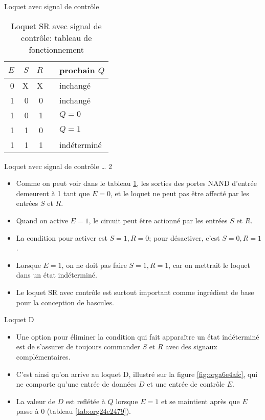\documentclass[presentation]{beamer}
\begin{document}
\begin{frame}[label={sec:org23cd420}]{Loquet avec signal de contrôle}
\begin{table}[htbp]
\caption{\label{tab:orgb91c010}Loquet SR avec signal de contrôle: tableau de fonctionnement}
\centering
\begin{tabular}{rrrll}
\(E\) & \(S\) & \(R\) &  & prochain \(Q\)\\
\hline
0 & X & X &  & inchangé\\
1 & 0 & 0 &  & inchangé\\
1 & 0 & 1 &  & \(Q = 0\)\\
1 & 1 & 0 &  & \(Q = 1\)\\
1 & 1 & 1 &  & indéterminé\\
\end{tabular}
\end{table}
\end{frame}

\begin{frame}[label={sec:org99cd461}]{Loquet avec signal de contrôle \ldots{} 2}
\begin{itemize}
\item Comme on peut voir dans le tableau \ref{tab:orgb91c010}, les sorties des portes NAND d'entrée demeurent à 1 tant que \(E = 0\), et le loquet ne peut pas être affecté par les entrées \(S\) et \(R\).

\item Quand on active \(E = 1\), le circuit peut être actionné par les entrées \(S\) et \(R\).

\item La condition pour activer est \(S=1, R=0\); pour désactiver, c'est \(S=0, R=1\).

\item Lorsque \(E = 1\), on ne doit pas faire \(S=1, R=1\), car on mettrait le loquet dans un état indéterminé.

\item Le loquet SR avec contrôle est surtout important comme ingrédient de base pour la conception de bascules.
\end{itemize}
\end{frame}

\begin{frame}[label={sec:org72559af}]{Loquet D}
\begin{itemize}
\item Une option pour éliminer la condition qui fait apparaître un état indéterminé est de s'assurer de toujours commander \(S\) et \(R\) avec des signaux complémentaires.

\item C'est ainsi qu'on arrive au loquet D, illustré sur la figure \ref{fig:orga6e4afc}, qui ne comporte qu'une entrée de données \(D\) et une entrée de contrôle \(E\).

\item La valeur de \(D\) est reflétée à \(Q\) lorsque \(E=1\) et se maintient après que \(E\) passe à 0 (tableau \ref{tab:org24c2479}).
\end{itemize}
\end{frame}
\end{document}
